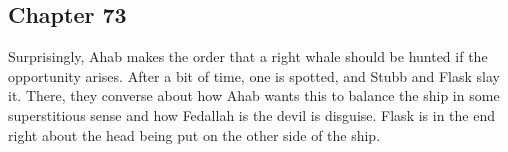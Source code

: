 \subsection{Chapter 73}

Surprisingly, Ahab makes the order that a right whale should be hunted if the
opportunity arises. After a bit of time, one is spotted, and Stubb and Flask
slay it. There, they converse about how Ahab wants this to balance the ship in
some superstitious sense and how Fedallah is the devil is disguise. Flask is in
the end right about the head being put on the other side of the ship.

